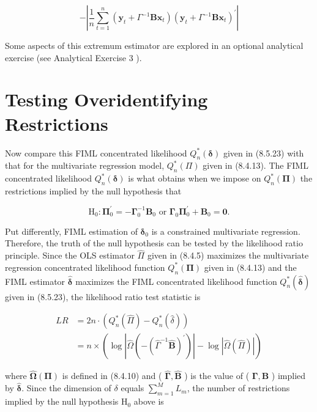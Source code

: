\documentclass[10pt]{article}
\begin{document}
$$
-\left|\frac{1}{n} \sum_{t=1}^{n}\left(\mathbf{y}_{t}+\Gamma^{-1} \mathbf{B} \mathbf{x}_{t}\right)\left(\mathbf{y}_{t}+\Gamma^{-1} \mathbf{B} \mathbf{x}_{t}\right)^{\prime}\right|
$$

Some aspects of this extremum estimator are explored in an optional analytical exercise (see Analytical Exercise 3 ).

\section*{Testing Overidentifying Restrictions}
Now compare this FIML concentrated likelihood $Q_{n}^{*}(\boldsymbol{\delta})$ given in (8.5.23) with that for the multivariate regression model, $Q_{n}^{*}(\Pi)$ given in (8.4.13). The FIML concentrated likelihood $Q_{n}^{*}(\boldsymbol{\delta})$ is what obtains when we impose on $Q_{n}^{*}(\boldsymbol{\Pi})$ the restrictions implied by the null hypothesis that


\begin{equation*}
\mathrm{H}_{0}: \boldsymbol{\Pi}_{0}^{\prime}=-\boldsymbol{\Gamma}_{0}^{-1} \mathbf{B}_{0} \text { or } \boldsymbol{\Gamma}_{0} \boldsymbol{\Pi}_{0}^{\prime}+\mathbf{B}_{0}=\mathbf{0} . \tag{8.5.24}
\end{equation*}


Put differently, FIML estimation of $\boldsymbol{\delta}_{0}$ is a constrained multivariate regression. Therefore, the truth of the null hypothesis can be tested by the likelihood ratio principle. Since the OLS estimator $\widehat{\Pi}$ given in (8.4.5) maximizes the multivariate regression concentrated likelihood function $Q_{n}^{*}(\boldsymbol{\Pi})$ given in (8.4.13) and the FIML estimator $\hat{\boldsymbol{\delta}}$ maximizes the FIML concentrated likelihood function $Q_{n}^{*}(\hat{\boldsymbol{\delta}})$ given in (8.5.23), the likelihood ratio test statistic is


\begin{align*}
L R & =2 n \cdot\left(Q_{n}^{*}(\widehat{\Pi})-Q_{n}^{*}(\hat{\delta})\right) \\
& =n \times\left(\log \left|\widehat{\Omega}\left(-\left(\widehat{\Gamma}^{-1} \widehat{\mathbf{B}}\right)^{\prime}\right)\right|-\log |\widehat{\Omega}(\widehat{\Pi})|\right) \tag{8.5.25}
\end{align*}


where $\widehat{\boldsymbol{\Omega}}(\boldsymbol{\Pi})$ is defined in (8.4.10) and ( $\widehat{\boldsymbol{\Gamma}}, \widehat{\mathbf{B}}$ ) is the value of ( $\boldsymbol{\Gamma}, \mathbf{B}$ ) implied by $\hat{\boldsymbol{\delta}}$. Since the dimension of $\delta$ equals $\sum_{m=1}^{M} L_{m}$, the number of restrictions implied by the null hypothesis $\mathrm{H}_{0}$ above is
\end{document}
